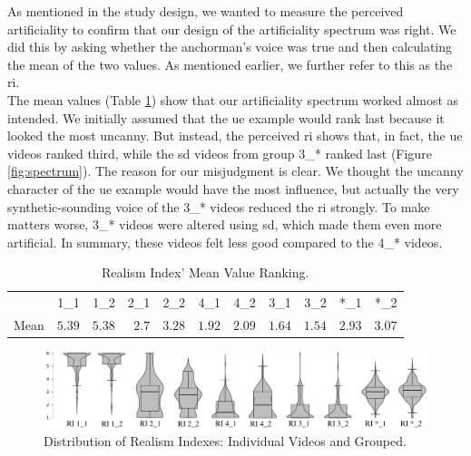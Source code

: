 \documentclass[
  a4paper,  %
  twoside,  %
  bibliography=totoc,
  headsepline,
  cleardoublepage=empty,
  parskip=half,
  draft=false
]{scrbook}
\begin{document}
As mentioned in the study design, we wanted to measure the perceived artificiality to confirm that our design of the artificiality spectrum was right. We did this by asking whether the anchorman's voice was true and then calculating the mean of the two values. As mentioned earlier, we further refer to this as the \gls{ri}. \\
The mean values (Table \ref{tab:RIs-mean}) show that our artificiality spectrum worked almost as intended. We initially assumed that the \gls{ue} example would rank last because it looked the most uncanny. But instead, the perceived \gls{ri} shows that, in fact, the \gls{ue} videos ranked third, while the \gls{sd} videos from group 3\_* ranked last (Figure \ref{fig:spectrum}). The reason for our misjudgment is clear. We thought the uncanny character of the \gls{ue} example would have the most influence, but actually the very synthetic-sounding voice of the 3\_* videos reduced the \gls{ri} strongly. To make matters worse, 3\_* videos were altered using \gls{sd}, which made them even more artificial. In summary, these videos felt less good compared to the 4\_* videos.

\begin{table}[h]
	\centering
	\caption{Realism Index' Mean Value Ranking.}
	\label{tab:RIs-mean}
	{
		\begin{tabular}{lrrrrrrrrrr}
			\toprule
			 & 1\_1 & 1\_2 & 2\_1 & 2\_2 & 4\_1 & 4\_2 & 3\_1 & 3\_2 & *\_1 & *\_2 \\
			\cmidrule[0.4pt]{1-11}
			Mean & $5.39$ & $5.38$ & $2.7$ & $3.28$ & $1.92$ & $2.09$ & $1.64$ & $1.54$  & $2.93$ & $3.07$\\
			\bottomrule
		\end{tabular}
	}
\end{table}
\begin{figure}[h]
  \includegraphics[width=1\textwidth]{graphics/statistics/RIs/RI_compilation.png}
  \caption{Distribution of Realism Indexes: Individual Videos and Grouped.}
  \label{fig:all-RIs}
\end{figure}
\end{document}
